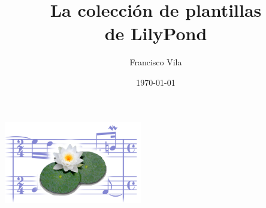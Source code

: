 \documentclass[a5paper,10pt,twoside,headinclude,titlepage]{article} %
\title{La colección de plantillas\\de LilyPond}
\author{Francisco Vila}
\date{\today}
\begin{document}
\nonfrenchspacing

\begin{titlepage} %
  \makeatletter
  \begin{center}
    \vfill
    \includegraphics[width=60mm]{lily-logo.png}\par
    \vfill
    \textbf{\huge\@title}\par
    {\@date}
    \vfill
    \textbf{\large\@author}
    \vfill
  \end{center}
  \makeatother
\end{titlepage}


\begin{singlespace} %
  \tableofcontents
\end{singlespace}
 
 
 
 
 
 
 
 
\end{document}
